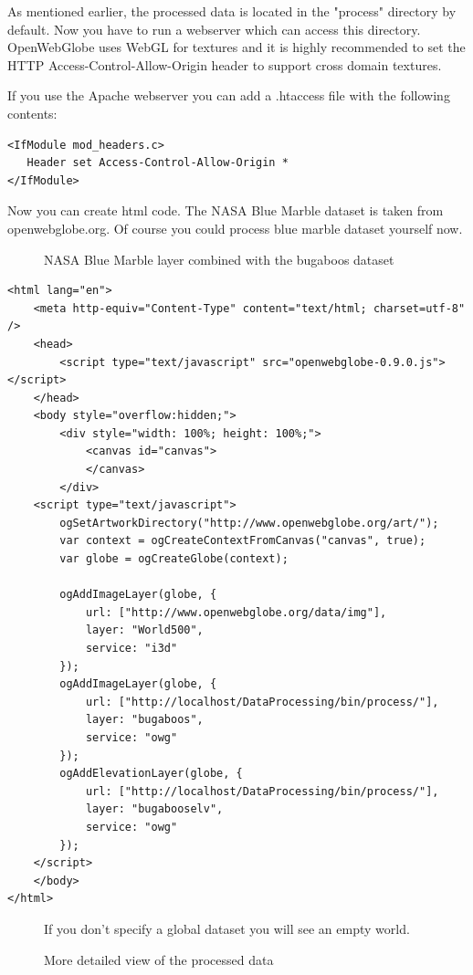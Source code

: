 \documentclass[
	12pt,
	a4paper,
	english,	
	appendixprefix,				     			        
	openany,		     	
	abstracton,		    		    
 	BCOR8mm,		    
]{scrartcl}
\newcommand{\bildhalf}[2]{\begin{figure}[H]
      \centering
      \noindent{\texttt{[image: \#1]}}\caption{#2}
\end{figure}}
\begin{document}
As mentioned earlier, the processed data is located in the "process" directory by default. Now you have to run a webserver which can access this directory. OpenWebGlobe uses WebGL for textures and it is highly recommended to set the HTTP Access-Control-Allow-Origin header to support cross domain textures.

If you use the Apache webserver you can add a .htaccess file with the following contents:

\begin{lstlisting}
<IfModule mod_headers.c>
   Header set Access-Control-Allow-Origin *
</IfModule>
\end{lstlisting}

Now you can create html code. The NASA Blue Marble dataset is taken from openwebglobe.org. Of course you could process blue marble dataset yourself now.

\bildhalf{images/bbs02.png}{NASA Blue Marble layer combined with the bugaboos dataset}

\lstset{language=html}
\begin{lstlisting}
<html lang="en">
	<meta http-equiv="Content-Type" content="text/html; charset=utf-8" />	  
	<head>
		<script type="text/javascript" src="openwebglobe-0.9.0.js"></script>
	</head>
	<body style="overflow:hidden;">
		<div style="width: 100%; height: 100%;">
			<canvas id="canvas">
			</canvas>
		</div>
	<script type="text/javascript">
        ogSetArtworkDirectory("http://www.openwebglobe.org/art/");
		var context = ogCreateContextFromCanvas("canvas", true);
		var globe = ogCreateGlobe(context);
		
        ogAddImageLayer(globe, {
            url: ["http://www.openwebglobe.org/data/img"],
            layer: "World500",
            service: "i3d"
		});
        ogAddImageLayer(globe, {
            url: ["http://localhost/DataProcessing/bin/process/"],
            layer: "bugaboos",
            service: "owg"
		});
        ogAddElevationLayer(globe, {
            url: ["http://localhost/DataProcessing/bin/process/"],
            layer: "bugabooselv",
            service: "owg"
		});
	</script>
	</body>
</html>
\end{lstlisting}
\lstset{language=bash}


\bildhalf{images/bbs00.png}{If you don't specify a global dataset you will see an empty world.}


\bildhalf{images/bbs01.png}{More detailed view of the processed data}



\end{document}
